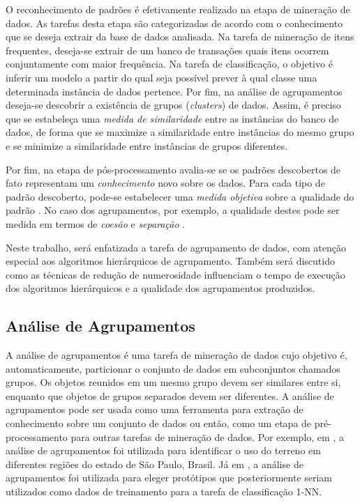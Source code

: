O reconhecimento de padrões é efetivamente realizado na etapa de mineração de
dados. As tarefas desta etapa são categorizadas de acordo com o conhecimento que
se deseja extrair da base de dados analisada. Na tarefa de mineração de itens
frequentes, deseja-se extrair de um banco de transações quais itens ocorrem
conjuntamente com maior frequência. Na tarefa de classificação, o objetivo é
inferir um modelo a partir do qual seja possível prever à qual classe uma
determinada instância de dados pertence. Por fim, na análise de agrupamentos
deseja-se descobrir a existência de grupos (\emph{clusters}) de dados. Assim, é
preciso que se estabeleça uma \emph{medida de similaridade} entre as instâncias
do banco de dados, de forma que se maximize a similaridade entre instâncias do
mesmo grupo e se minimize a similaridade entre instâncias de grupos diferentes.

Por fim, na etapa de pós-processamento avalia-se se os padrões descobertos de
fato representam um \emph{conhecimento} novo sobre os dados. Para cada tipo
de padrão descoberto, pode-se estabelecer uma \emph{medida objetiva} sobre a
qualidade do padrão \cite{han2011data}. No caso dos agrupamentos, por exemplo,
a qualidade destes pode ser medida em termos de \emph{coesão} e \emph{separação}
\cite{tan2009introducao}.

Neste trabalho, será enfatizada a tarefa de agrupamento de dados, com atenção
especial aos algoritmos hierárquicos de agrupamento. Também será discutido como
as técnicas de redução de numerosidade influenciam o tempo de execução dos
algoritmos hierárquicos e a qualidade dos agrupamentos produzidos.


\subsection{Análise de Agrupamentos}
	\label{subsec:analise_agrupamentos}
	
A análise de agrupamentos é uma tarefa de mineração de dados cujo objetivo é,
automaticamente, particionar o conjunto de dados em subconjuntos chamados
grupos. Os objetos reunidos em um mesmo grupo devem ser similares entre si,
enquanto que objetos de grupos separados devem ser diferentes. A análise de 
agrupamentos pode ser usada como uma ferramenta para extração de conhecimento
sobre um conjunto de dados ou então, como um etapa de pré-processamento para
outras tarefas de mineração de dados. Por exemplo, em \cite{gonccalves2014land},
a análise de agrupamentos foi utilizada para identificar o uso do terreno em
diferentes regiões do estado de São Paulo, Brasil. Já em
\cite{petitjean2014dynamic}, a análise de agrupamentos foi utilizada para eleger
protótipos que posteriormente seriam utilizados como dados de treinamento para a
tarefa de classificação 1-NN.





